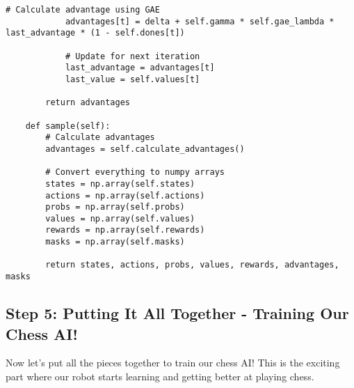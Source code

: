 \documentclass[11pt]{article}
\begin{document}
\begin{tcolorbox}[colback=brown!5!white,colframe=brown!75!black,title=Building the Memory System]
\begin{lstlisting}[style=Python]
            # Calculate advantage using GAE
            advantages[t] = delta + self.gamma * self.gae_lambda * last_advantage * (1 - self.dones[t])
            
            # Update for next iteration
            last_advantage = advantages[t]
            last_value = self.values[t]
        
        return advantages
    
    def sample(self):
        # Calculate advantages
        advantages = self.calculate_advantages()
        
        # Convert everything to numpy arrays
        states = np.array(self.states)
        actions = np.array(self.actions)
        probs = np.array(self.probs)
        values = np.array(self.values)
        rewards = np.array(self.rewards)
        masks = np.array(self.masks)
        
        return states, actions, probs, values, rewards, advantages, masks
\end{lstlisting}
\end{tcolorbox}

\subsection{Step 5: Putting It All Together - Training Our Chess AI!}

Now let's put all the pieces together to train our chess AI! This is the exciting part where our robot starts learning and getting better at playing chess.
\end{document}
